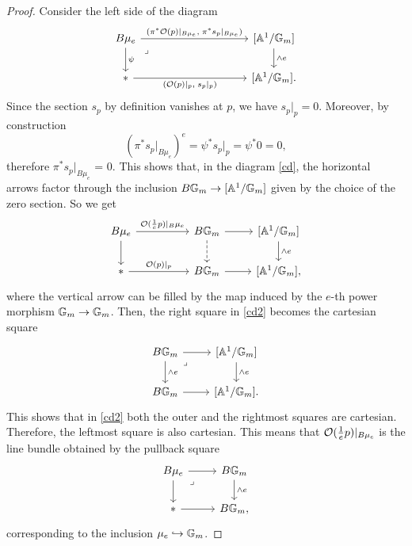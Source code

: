\begin{proof}
    Consider the left side of the diagram
    \begin{equation}\label{cd}
    \begin{tikzcd}
	{B\mu_e} &&&& {[\Ab^1/\Gb_m]} \\
	{*} &&&& {[\Ab^1/\Gb_m].}
	\arrow["{{(\pi^*\O(p)\vert_{B\mu_e}, \; \pi^*s_p\vert_{B\mu_e})}}", from=1-1, to=1-5]
	\arrow["\psi", from=1-1, to=2-1]
	\arrow["{{{\wedge e}}}", from=1-5, to=2-5]
	\arrow[""{name=0, anchor=center, inner sep=0}, "{{(\O(p)\vert_p, \; s_p\vert_p)}}"', from=2-1, to=2-5]
	\arrow["\lrcorner"{anchor=center, pos=0.125}, draw=none, from=1-1, to=0]
    \end{tikzcd}
    \end{equation}
    Since the section $s_p$ by definition vanishes at $p$, we have $s_p \vert_p = 0$. Moreover, by construction
    \[
    (\pi^* s_p \vert_{B\mu_e})^e = \psi^* s_p \vert_p = \psi^* 0 = 0,
    \]
    therefore $\pi^* s_p \vert_{B\mu_e}$ = 0. This shows that, in the diagram \eqref{cd}, the horizontal arrows factor through the inclusion $B\mathbb{G}_m \to [\mathbb{A}^1 / \mathbb{G}_m]$ given by the choice of the zero section. So we get
    \begin{equation}\label{cd2}
    \begin{tikzcd}
	{B\mu_e} && {B\Gb_m} & {[\Ab^1/\Gb_m]} \\
	{*} && {B\Gb_m} & {[\Ab^1/\Gb_m],}
	\arrow["{\O(\frac{1}{e}p) \vert_B\mu_e}", from=1-1, to=1-3]
	\arrow[from=1-1, to=2-1]
	\arrow[from=1-3, to=1-4]
	\arrow[dashed, from=1-3, to=2-3]
	\arrow["{{{\wedge e}}}", from=1-4, to=2-4]
	\arrow["{\O(p)\vert_p}", from=2-1, to=2-3]
	\arrow[from=2-3, to=2-4]
    \end{tikzcd}
    \end{equation}
    where the vertical arrow can be filled by the map induced by the $e$-th power morphism $\mathbb{G}_m \to \mathbb{G}_m$. Then, the right square in \eqref{cd2} becomes the cartesian square
    \[\begin{tikzcd}
	{B\Gb_m} & {[\Ab^1/\Gb_m]} \\
	{B\Gb_m} & {[\Ab^1/\Gb_m].}
	\arrow[from=1-1, to=1-2]
	\arrow["{\wedge e}", from=1-1, to=2-1]
	\arrow["\lrcorner"{anchor=center, pos=0.125}, draw=none, from=1-1, to=2-2]
	\arrow["{{{\wedge e}}}", from=1-2, to=2-2]
	\arrow[from=2-1, to=2-2]
    \end{tikzcd}\]
    This shows that in \eqref{cd2} both the outer and the rightmost squares are cartesian. Therefore, the leftmost square is also cartesian. This means that $\mathcal{O}(\frac{1}{e}p)\vert_{B\mu_e}$ is the line bundle obtained by the pullback square
    \[\begin{tikzcd}
	{B\mu_e} & {B\Gb_m} \\
	{*} & {B\Gb_m,}
	\arrow[from=1-1, to=1-2]
	\arrow[from=1-1, to=2-1]
	\arrow["\lrcorner"{anchor=center, pos=0.125}, draw=none, from=1-1, to=2-2]
	\arrow["{\wedge e}", from=1-2, to=2-2]
	\arrow[from=2-1, to=2-2]
    \end{tikzcd}\]
    corresponding to the inclusion $\mu_e \hookrightarrow \mathbb{G}_m$.
\end{proof}

